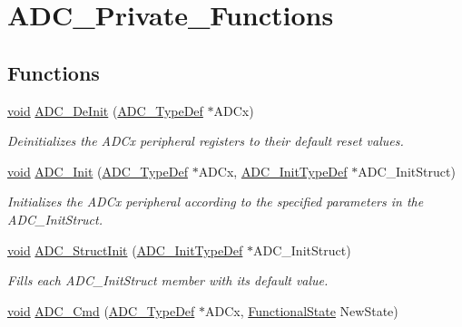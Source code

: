 \hypertarget{group___a_d_c___private___functions}{}\section{A\+D\+C\+\_\+\+Private\+\_\+\+Functions}
\label{group___a_d_c___private___functions}
\subsection*{Functions}
\begin{DoxyCompactItemize}
\item 
\hyperlink{usb__devapi_8h_afabf60e7f57651d6d595a02c75f07cd0}{void} \hyperlink{group___a_d_c___private___functions_ga31fa6bc09de17125e9db2830ce77c09b}{A\+D\+C\+\_\+\+De\+Init} (\hyperlink{struct_a_d_c___type_def}{A\+D\+C\+\_\+\+Type\+Def} $\ast$A\+D\+Cx)
\begin{DoxyCompactList}\small\item\em Deinitializes the A\+D\+Cx peripheral registers to their default reset values. \end{DoxyCompactList}\item 
\hyperlink{usb__devapi_8h_afabf60e7f57651d6d595a02c75f07cd0}{void} \hyperlink{group___a_d_c___private___functions_gabbab6038cf8691404350625e477254f9}{A\+D\+C\+\_\+\+Init} (\hyperlink{struct_a_d_c___type_def}{A\+D\+C\+\_\+\+Type\+Def} $\ast$A\+D\+Cx, \hyperlink{struct_a_d_c___init_type_def}{A\+D\+C\+\_\+\+Init\+Type\+Def} $\ast$A\+D\+C\+\_\+\+Init\+Struct)
\begin{DoxyCompactList}\small\item\em Initializes the A\+D\+Cx peripheral according to the specified parameters in the A\+D\+C\+\_\+\+Init\+Struct. \end{DoxyCompactList}\item 
\hyperlink{usb__devapi_8h_afabf60e7f57651d6d595a02c75f07cd0}{void} \hyperlink{group___a_d_c___private___functions_ga6c6e754d1d0a98d56e465efaf73272ec}{A\+D\+C\+\_\+\+Struct\+Init} (\hyperlink{struct_a_d_c___init_type_def}{A\+D\+C\+\_\+\+Init\+Type\+Def} $\ast$A\+D\+C\+\_\+\+Init\+Struct)
\begin{DoxyCompactList}\small\item\em Fills each A\+D\+C\+\_\+\+Init\+Struct member with its default value. \end{DoxyCompactList}\item 
\hyperlink{usb__devapi_8h_afabf60e7f57651d6d595a02c75f07cd0}{void} \hyperlink{group___a_d_c___private___functions_ga40882d399e3371755ed610c1134e634e}{A\+D\+C\+\_\+\+Cmd} (\hyperlink{struct_a_d_c___type_def}{A\+D\+C\+\_\+\+Type\+Def} $\ast$A\+D\+Cx, \hyperlink{agilefox_2library_2inc_2stm32f10x__type_8h_ac9a7e9a35d2513ec15c3b537aaa4fba1}{Functional\+State} New\+State)

\end{DoxyCompactItemize}
